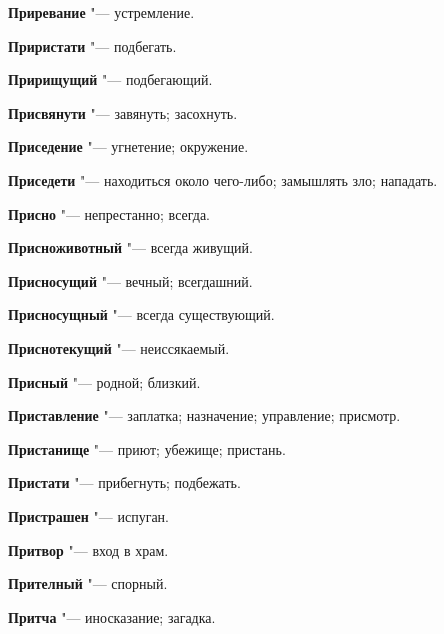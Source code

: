 \begin{mymulticols}{2}
\noindent\textbf{Приревание} "--- устремление. 




\noindent\textbf{Приристати} "--- подбегать. 




\noindent\textbf{Пририщущий} "--- подбегающий. 




\noindent\textbf{Присвянути} "--- завянуть; засохнуть. 




\noindent\textbf{Приседение} "--- угнетение; окружение. 




\noindent\textbf{Приседети} "--- находиться около чего-либо; замышлять зло; нападать. 




\noindent\textbf{Присно} "--- непрестанно; всегда. 




\noindent\textbf{Присноживотный} "--- всегда живущий. 




\noindent\textbf{Присносущий} "--- вечный; всегдашний. 




\noindent\textbf{Присносущный} "--- всегда существующий. 




\noindent\textbf{Приснотекущий} "--- неиссякаемый. 




\noindent\textbf{Присный} "--- родной; близкий. 




\noindent\textbf{Приставление} "--- заплатка; назначение; управление; присмотр. 




\noindent\textbf{Пристанище} "--- приют; убежище; пристань. 




\noindent\textbf{Пристати} "--- прибегнуть; подбежать. 




\noindent\textbf{Пристрашен} "--- испуган. 




\noindent\textbf{Притвор} "--- вход в храм. 




\noindent\textbf{Прителный} "--- спорный. 




\noindent\textbf{Притча} "--- иносказание; загадка. 





\end{mymulticols}
